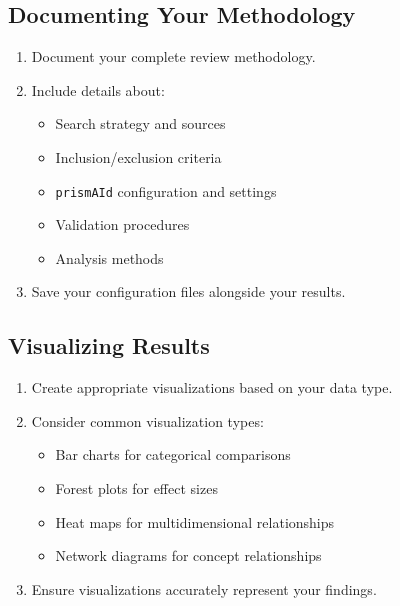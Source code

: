 \subsection{Documenting Your Methodology}

\begin{enumerate}
    \item Document your complete review methodology.
    \item Include details about:
    \begin{itemize}
        \item Search strategy and sources
        \item Inclusion/exclusion criteria
        \item \texttt{prismAId} configuration and settings
        \item Validation procedures
        \item Analysis methods
    \end{itemize}
    \item Save your configuration files alongside your results.
\end{enumerate}

\subsection{Visualizing Results}

\begin{enumerate}
    \item Create appropriate visualizations based on your data type.
    \item Consider common visualization types:
    \begin{itemize}
        \item Bar charts for categorical comparisons
        \item Forest plots for effect sizes
        \item Heat maps for multidimensional relationships
        \item Network diagrams for concept relationships
    \end{itemize}
    \item Ensure visualizations accurately represent your findings.
\end{enumerate}

